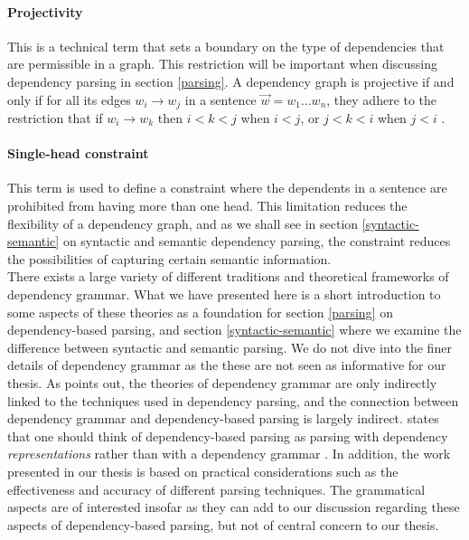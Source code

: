\paragraph{Projectivity} This is a technical term that sets a boundary on the type of dependencies that are permissible in a graph. This restriction will be important when discussing dependency parsing in section \ref{parsing}. A dependency graph is projective if and only if for all its edges $w_i \rightarrow w_j$ in a sentence $\vec{w} = w_1 ... w_n$, they adhere to the restriction that if $w_i \rightarrow w_k$ then $i < k < j$ when $i < j$, or $j < k < i$ when $j < i$ \cite{KublerEtAl:09}.

\paragraph{Single-head constraint} This term is used to define a constraint where the dependents in a sentence are prohibited from having more than one head. This limitation reduces the flexibility of a dependency graph, and as we shall see in section \ref{syntactic-semantic} on syntactic and semantic dependency parsing, the constraint reduces the possibilities of capturing certain semantic information.\\

There exists a large variety of different traditions and theoretical frameworks of dependency grammar. What we have presented here is a short introduction to some aspects of these theories as a foundation for section \ref{parsing} on dependency-based parsing, and section \ref{syntactic-semantic} where we examine the difference between syntactic and semantic parsing. We do not dive into the finer details of dependency grammar as the these are not seen as informative for our thesis. As \citeauthor{Niv:05} points out, the theories of dependency grammar are only indirectly linked to the techniques used in dependency parsing, and the connection between dependency grammar and dependency-based parsing is largely indirect. \citeauthor{Niv:05} states that one should think of dependency-based parsing as parsing with dependency \textit{representations} rather than with a dependency grammar \cite{Niv:05}. In addition, the work presented in our thesis is based on practical considerations such as the effectiveness and accuracy of different parsing techniques. The grammatical aspects are of interested insofar as they can add to our discussion regarding these aspects of dependency-based parsing, but not of central concern to our thesis.

